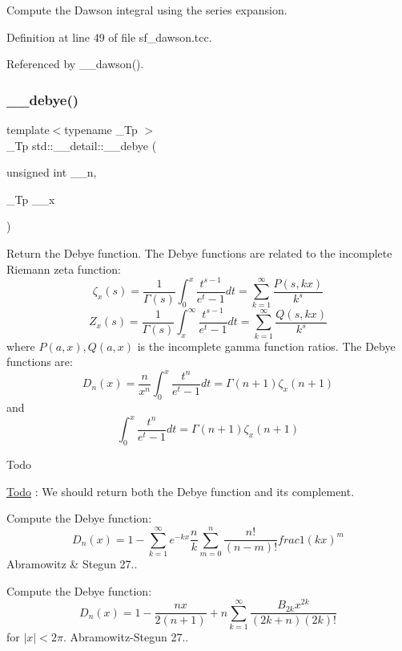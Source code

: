 Compute the Dawson integral using the series expansion. 



Definition at line 49 of file sf\+\_\+dawson.\+tcc.



Referenced by \+\_\+\+\_\+dawson().

\mbox{\label{namespacestd_1_1____detail_a26d3f285cfbcaba6fa30d3e4164c6187}} 
\subsubsection{\texorpdfstring{\+\_\+\+\_\+debye()}{\_\_debye()}}
{\footnotesize\ttfamily template$<$typename \+\_\+\+Tp $>$ \\
\+\_\+\+Tp std\+::\+\_\+\+\_\+detail\+::\+\_\+\+\_\+debye (\begin{DoxyParamCaption}\item[{unsigned int}]{\+\_\+\+\_\+n,  }\item[{\+\_\+\+Tp}]{\+\_\+\+\_\+x }\end{DoxyParamCaption})}

Return the Debye function. The Debye functions are related to the incomplete Riemann zeta function\+: \[ \zeta_x(s) = \frac{1}{\Gamma(s)}\int_{0}^{x}\frac{t^{s-1}}{e^t-1}dt = \sum_{k=1}^{\infty}\frac{P(s,kx)}{k^s} \] \[ Z_x(s) = \frac{1}{\Gamma(s)}\int_{x}^{\infty}\frac{t^{s-1}}{e^t-1}dt = \sum_{k=1}^{\infty}\frac{Q(s,kx)}{k^s} \] where $ P(a,x), Q(a,x) $ is the incomplete gamma function ratios. The Debye functions are\+: \[ D_n(x) = \frac{n}{x^n}\int_{0}^{x}\frac{t^n}{e^t-1}dt = \Gamma(n+1)\zeta_x(n+1) \] and \[ \int_{0}^{x}\frac{t^n}{e^t-1}dt = \Gamma(n+1)\zeta_x(n+1) \]

\begin{DoxyRefDesc}{Todo}
\item[\hyperlink{todo__todo000019}{Todo}]\+: We should return both the Debye function and it\textquotesingle{}s complement. \end{DoxyRefDesc}
Compute the Debye function\+: \[ D_n(x) = 1 - \sum_{k = 1}^{\infty} e^{-kx} \frac{n}{k}\sum_{m=0}^{n}\frac{n!}{(n-m)!}frac{1}{(kx)^m} \] Abramowitz \& Stegun 27..

Compute the Debye function\+: \[ D_n(x) = 1 - \frac{n x}{2(n+1)} + n \sum_{k = 1}^{\infty} \frac{B_{2k} x^{2k}}{(2k + n)(2k)!} \] for $ |x| < 2\pi $. Abramowitz-\/\+Stegun 27..

